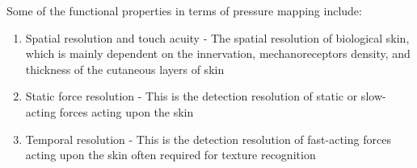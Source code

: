 Some of the functional properties in terms of pressure mapping include:
\begin{enumerate}
    \item Spatial resolution and touch acuity - The spatial resolution of biological skin, which is mainly dependent on the innervation, mechanoreceptors density, and thickness of the cutaneous layers of skin \cite{Landry2021,Kalra2016,Graham2019,Annaidh2012}
    \item Static force resolution - This is the detection resolution of static or slow-acting forces acting upon the skin \cite{Krotoski1993}
    \item Temporal resolution - This is the detection resolution of fast-acting forces acting upon the skin often required for texture recognition \cite{Yokota2020,Klein2016,Krotoski1993}
\end{enumerate}

